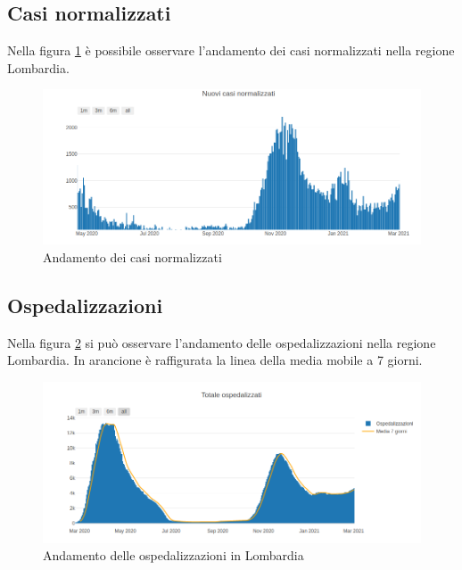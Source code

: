 \subsection{Casi normalizzati}
Nella figura \ref{fig:casi_norm_lomb} è possibile osservare l'andamento dei casi normalizzati nella regione Lombardia.
\begin{figure}[htp]
    \centering
    \includegraphics[width=14cm]{img/lomb/casi_norm_lomb.png}
    \caption{Andamento dei casi normalizzati}
    \label{fig:casi_norm_lomb}
\end{figure}

\subsection{Ospedalizzazioni}
Nella figura \ref{fig:ospedalizzati_lomb} si può osservare l'andamento delle ospedalizzazioni nella regione Lombardia.
In arancione è raffigurata la linea della media mobile a 7 giorni.
\begin{figure}[htp]
    \centering
    \includegraphics[width=14cm]{img/lomb/ospedalizzati_lomb.png}
    \caption{Andamento delle ospedalizzazioni in Lombardia}
    \label{fig:ospedalizzati_lomb}
\end{figure}

